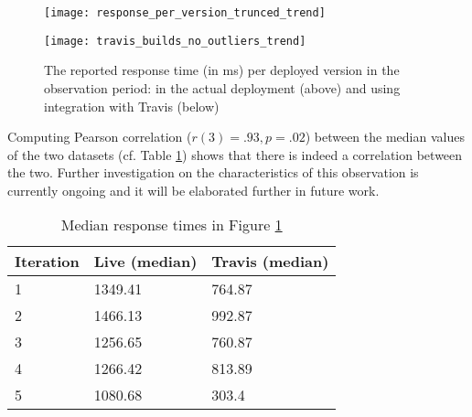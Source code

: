       \begin{figure}[h!]
        \centering
        \texttt{[image: response\_per\_version\_trunced\_trend]}


        \advance\leftskip-0.2cm
        \texttt{[image: travis\_builds\_no\_outliers\_trend]}
        \caption{The reported response time (in ms) per deployed version in the observation period: 
        in the actual deployment (above) and using integration with Travis (below)}        
        
        \label{fig:response_times_preemptive}
      \end{figure}

  Computing Pearson correlation ($r(3)=.93, p=.02$) between the median values of the two datasets (cf. Table \ref{tab:correlations}) shows that there is indeed a correlation between the two. Further investigation on the characteristics of this observation is currently ongoing and it will be elaborated further in future work.


    \begin{table}[h]
      
      \centering
      \begin{tabular}{lll}
        \toprule
        Iteration & \bfseries Live (median) & \bfseries Travis (median)\\
        \midrule
        1 & 1349.41 & 764.87\\ 
        2 & 1466.13 & 992.87\\
        3 & 1256.65 & 760.87\\
        4 & 1266.42 & 813.89\\
        5 & 1080.68 & 303.4\\
      \bottomrule
      
      \end{tabular}
      \caption{Median response times in Figure \ref{fig:response_times_preemptive}}
      \label{tab:correlations}
    \end{table}




  

